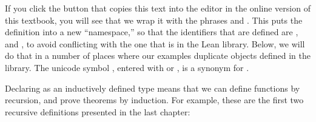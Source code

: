 \documentclass[letterpaper,10pt,english]{sphinxmanual}
\begin{document}
\begin{sphinxVerbatim}[commandchars=\\\{\}]
   
   
     
\end{sphinxVerbatim}

\sphinxAtStartPar
If you click the button that copies this text into the editor in the online version of this textbook, you will see that we wrap it with the phrases  and . This puts the definition into a new “namespace,” so that the identifiers that are defined are ,  and , to avoid conflicting with the one that is in the Lean library. Below, we will do that in a number of places where our examples duplicate objects defined in the library. The unicode symbol , entered with  or , is a synonym for .

\sphinxAtStartPar
Declaring  as an inductively defined type means that we can define functions by recursion, and prove theorems by induction. For example, these are the first two recursive definitions presented in the last chapter:

\begin{sphinxVerbatim}[commandchars=\\\{\}]
 

 

     
          
       

     
          
        
\end{sphinxVerbatim}
\end{document}
